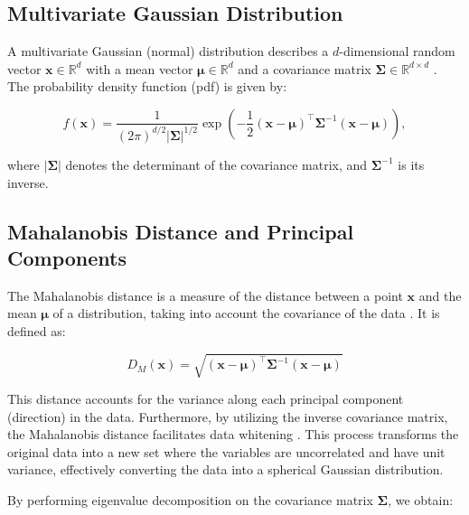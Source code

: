 \subsection{Multivariate Gaussian Distribution}

A multivariate Gaussian (normal) distribution describes a $d$-dimensional random vector $\mathbf{x} \in \mathbb{R}^d$ with a mean vector $\boldsymbol{\mu} \in \mathbb{R}^d$ and a covariance matrix $\boldsymbol{\Sigma} \in \mathbb{R}^{d \times d}$ \citep{bishop2006pattern}. The probability density function (pdf) is given by:

\begin{equation}
\label{eq:multivariate_gaussian}
f(\mathbf{x}) = \frac{1}{(2\pi)^{d/2} |\boldsymbol{\Sigma}|^{1/2}} \exp\left( -\frac{1}{2} (\mathbf{x} - \boldsymbol{\mu})^\top \boldsymbol{\Sigma}^{-1} (\mathbf{x} - \boldsymbol{\mu}) \right),
\end{equation}

where $|\boldsymbol{\Sigma}|$ denotes the determinant of the covariance matrix, and $\boldsymbol{\Sigma}^{-1}$ is its inverse.

\subsection{Mahalanobis Distance and Principal Components}

The Mahalanobis distance is a measure of the distance between a point $\mathbf{x}$ and the mean $\boldsymbol{\mu}$ of a distribution, taking into account the covariance of the data \citep{mahalanobis1936generalized}. It is defined as:

\begin{equation}
\label{eq:mahalanobis_distance}
D_M(\mathbf{x}) = \sqrt{ (\mathbf{x} - \boldsymbol{\mu})^\top \boldsymbol{\Sigma}^{-1} (\mathbf{x} - \boldsymbol{\mu}) }
\end{equation}

This distance accounts for the variance along each principal component (direction) in the data. Furthermore, by utilizing the inverse covariance matrix, the Mahalanobis distance facilitates data whitening \citep{bishop2006pattern}. This process transforms the original data into a new set where the variables are uncorrelated and have unit variance, effectively converting the data into a spherical Gaussian distribution.

By performing eigenvalue decomposition on the covariance matrix $\boldsymbol{\Sigma}$, we obtain:

